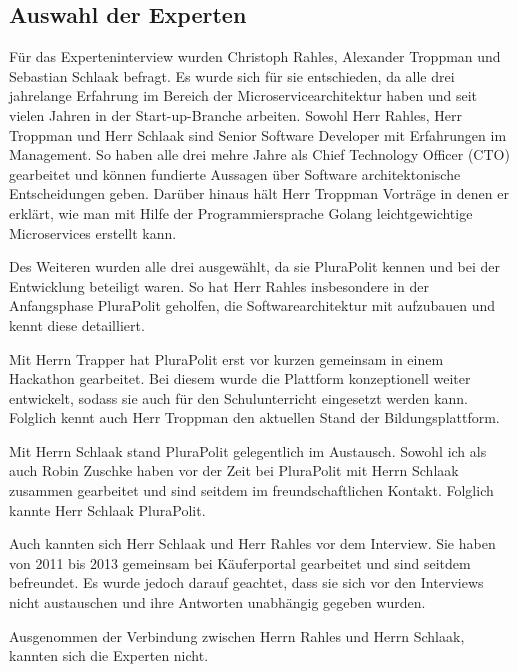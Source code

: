 \subsection{Auswahl der Experten}

Für das Experteninterview wurden Christoph Rahles, Alexander Troppman und Sebastian Schlaak befragt. Es wurde sich für sie entschieden, da alle drei jahrelange Erfahrung im Bereich der Microservicearchitektur haben und seit vielen Jahren in der Start-up-Branche arbeiten. Sowohl Herr Rahles, Herr Troppman und Herr Schlaak sind Senior Software Developer mit Erfahrungen im Management. So haben alle drei mehre Jahre als Chief Technology Officer (CTO) gearbeitet und können fundierte Aussagen über Software architektonische Entscheidungen geben. Darüber hinaus hält Herr Troppman Vorträge in denen er erklärt, wie man mit Hilfe der Programmiersprache Golang leichtgewichtige Microservices erstellt kann.

Des Weiteren wurden alle drei ausgewählt, da sie PluraPolit kennen und bei der Entwicklung beteiligt waren. So hat Herr Rahles insbesondere in der Anfangsphase PluraPolit geholfen, die Softwarearchitektur mit aufzubauen und kennt diese detailliert.

Mit Herrn Trapper hat PluraPolit erst vor kurzen gemeinsam in einem Hackathon gearbeitet. Bei diesem wurde die Plattform konzeptionell weiter entwickelt, sodass sie auch für den Schulunterricht eingesetzt werden kann. Folglich kennt auch Herr Troppman den aktuellen Stand der Bildungsplattform.

Mit Herrn Schlaak stand PluraPolit gelegentlich im Austausch. Sowohl ich als auch Robin Zuschke haben vor der Zeit bei PluraPolit mit Herrn Schlaak zusammen gearbeitet und sind seitdem im freundschaftlichen Kontakt. Folglich kannte Herr Schlaak PluraPolit. 

Auch kannten sich Herr Schlaak und Herr Rahles vor dem Interview. Sie haben von 2011 bis 2013 gemeinsam bei Käuferportal gearbeitet und sind seitdem befreundet. Es wurde jedoch darauf geachtet, dass sie sich vor den Interviews nicht austauschen und ihre Antworten unabhängig gegeben wurden.

Ausgenommen der Verbindung zwischen Herrn Rahles und Herrn Schlaak, kannten sich die Experten nicht.